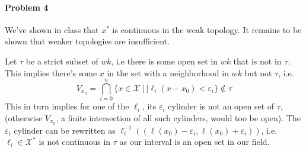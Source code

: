 \documentclass[12pt]{article}
\newcommand{\X}{\mathcal{X}}
\begin{document}
\paragraph{Problem 4}

We've shown in class that $x^*$ is continuous in the weak topology. It remains
to be shown that weaker topologies are insufficient.

Let $\tau$ be a strict subset of $wk$, i.e there is some open set in $wk$ that
is not in $\tau$. This implies there's some $x$ in the set with a
neighborhood in $wk$ but not $\tau$, i.e.
\begin{displaymath}
  V_{x_0} = \bigcap_{i=0}^n\{x\in\X\ |\ |\ell_i(x-x_0)<\varepsilon_i\}\notin\tau 
\end{displaymath}
This in turn implies for one of the $\ell_i$, its $\varepsilon_i$ cylinder is
not an open set of $\tau$, (otherwise $V_{x_0}$, a finite intersection of all
such cylinders, would too be open). The $\varepsilon_i$ cylinder can be
rewritten as $\ell_i^{-1}((\ell(x_0)-\varepsilon_i, \ell(x_0)+\varepsilon_i))$,
i.e. $\ell_i\in \X^*$ is not continuous in $\tau$ as our interval is an open
set in our field.
\end{document}
